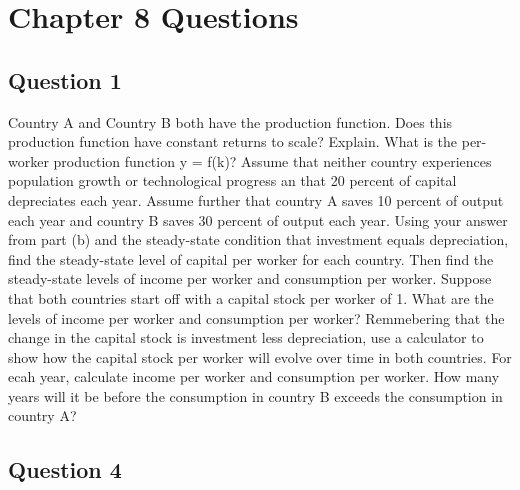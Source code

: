 \newpage 

\section*{Chapter 8 Questions}


\subsection*{Question 1}

 Country A and Country B both have the production function. Does this production function have constant returns to scale? Explain. 
      What is the per-worker production function y = f(k)? Assume that neither country experiences population growth or technological progress an that 20 percent of capital depreciates each year. 
      Assume further that country A saves 10 percent of output each year and country B saves 30 percent of output each year. Using your answer from part (b) and the steady-state condition that investment equals 
      depreciation, find the steady-state level of capital per worker for each country. Then find the steady-state levels of income per worker and consumption per worker. Suppose that both countries start off with a capital stock 
      per worker of 1. What are the levels of income per worker and consumption per worker? Remmebering that the change in the capital stock is investment less depreciation, use a calculator to show how the capital stock per 
      worker will evolve over time in both countries. For ecah year, calculate income per worker and consumption per worker. How many years will it be before the consumption in country B exceeds the consumption in country A? 


      \subsection*{Question 4}

